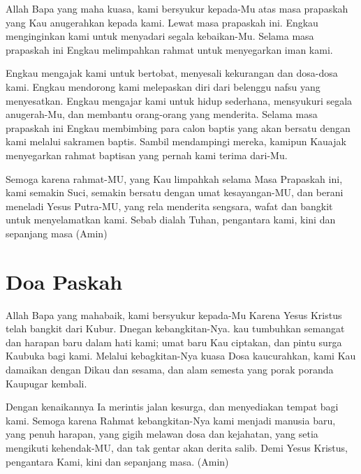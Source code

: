     Allah Bapa yang maha kuasa, kami bersyukur kepada-Mu atas masa prapaskah yang Kau anugerahkan kepada kami. Lewat masa prapaskah ini. Engkau menginginkan kami untuk menyadari segala kebaikan-Mu. Selama masa prapaskah ini Engkau melimpahkan rahmat untuk menyegarkan iman kami.

    Engkau mengajak kami untuk bertobat, menyesali kekurangan dan dosa-dosa kami. Engkau mendorong kami melepaskan diri dari belenggu nafsu yang menyesatkan. Engkau mengajar kami untuk hidup sederhana, mensyukuri segala anugerah-Mu, dan membantu orang-orang yang menderita. Selama masa prapaskah ini Engkau membimbing para calon baptis yang akan bersatu dengan kami melalui sakramen baptis. Sambil mendampingi mereka, kamipun Kauajak menyegarkan rahmat baptisan yang pernah kami terima dari-Mu.

    Semoga karena rahmat-MU, yang Kau limpahkah selama Masa Prapaskah ini, kami semakin Suci, semakin bersatu dengan umat kesayangan-MU, dan berani meneladi Yesus Putra-MU, yang rela menderita sengsara, wafat dan bangkit untuk menyelamatkan kami. Sebab dialah Tuhan, pengantara kami, kini dan sepanjang masa (Amin)


\section{Doa Paskah}    

    Allah Bapa yang mahabaik, kami bersyukur kepada-Mu Karena Yesus Kristus telah bangkit dari Kubur. Dnegan kebangkitan-Nya. kau tumbuhkan semangat dan harapan baru dalam hati kami; umat baru Kau ciptakan, dan pintu surga Kaubuka bagi kami. Melalui kebagkitan-Nya kuasa Dosa kaucurahkan, kami Kau damaikan dengan Dikau dan sesama, dan alam semesta yang porak poranda Kaupugar kembali.

    Dengan kenaikannya Ia merintis jalan kesurga, dan menyediakan tempat bagi kami. Semoga karena Rahmat kebangkitan-Nya kami menjadi manusia baru, yang penuh harapan, yang gigih melawan dosa dan kejahatan, yang setia mengikuti kehendak-MU, dan tak gentar akan derita salib. Demi Yesus Kristus, pengantara Kami, kini dan sepanjang masa. (Amin)
